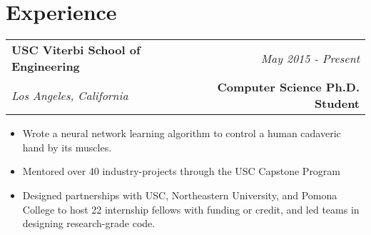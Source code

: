 \documentclass[10pt,a4paper]{article}
\begin{document}
  \newpage



    \vspace*{3mm}\section*{Experience}
  \noindent\begin{tabularx}{17cm}{X r}
    \textbf{USC Viterbi School of Engineering} & \textit{May 2015 - Present} \\
    \textit{Los Angeles, California} & \textbf{Computer Science Ph.D. Student} \\
  \end{tabularx}

  \vspace*{1mm}\noindent\begin{minipage}{17cm}
    \begin{itemize}[leftmargin=6mm,topsep=0mm,itemsep=-1mm]
      \item Wrote a neural network learning algorithm to control a human cadaveric hand by its muscles. 
      \item Mentored over 40 industry-projects through the USC Capstone Program
      \item Designed partnerships with USC, Northeastern University, and Pomona College to host 22 internship fellows with funding or credit, and led teams in designing research-grade code.
    \end{itemize}
  \end{minipage}
\end{document}
